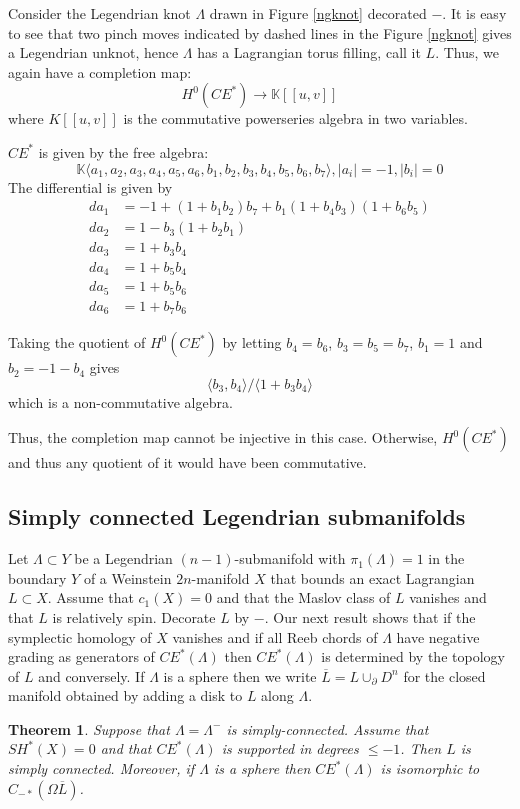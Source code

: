 \documentclass{gtpart}
\newtheorem{thm}{Theorem}
\newcommand{\K}{\mathbb{K}}
\begin{document}
Consider the Legendrian knot $\Lambda$ drawn in Figure \ref{ngknot} decorated $-$. It is easy to see
that two pinch moves indicated by dashed lines in the Figure \ref{ngknot} gives a Legendrian
unknot, hence $\Lambda$ has a Lagrangian torus filling, call it $L$. Thus, we again have a
completion map:
\[ H^0(CE^*) \to \K [[u, v]] \]
where $K[[u,v]]$ is the commutative powerseries algebra in two variables.

$CE^*$ is given by the free algebra:
\[ \K \langle a_1, a_2, a_3, a_4, a_5, a_6, b_1 ,b_2, b_3, b_4, b_5,b_6, b_7 \rangle ,
|a_i|=-1, |b_i| =0 \]
The differential is given by 
\begin{align*}
    da_1 &= -1 + (1+b_1 b_2)b_7 + b_1(1+b_4b_3) (1+b_6 b_5) \\
    da_2 &= 1- b_3(1+ b_2b_1) \\
    da_3 &= 1+ b_3b_4 \\
    da_4 &= 1+ b_5 b_4 \\
    da_5 &= 1+ b_5 b_6 \\
    da_6 &= 1+ b_7 b_6 
\end{align*}

Taking the quotient of $H^0(CE^*)$ by letting $b_4=b_6$, $b_3=b_5=b_7$, $b_1=1$ and $b_2=-1-b_4$
gives
\[ \langle  b_3, b_4 \rangle / \langle 1+ b_3b_4 \rangle \]
which is a non-commutative algebra.

Thus, the completion map cannot be injective in this case. Otherwise, $H^0(CE^*)$ and thus any
quotient of it would have been commutative. 


\subsection{Simply connected Legendrian submanifolds} 
Let $\Lambda\subset Y$ be a Legendrian
$(n-1)$-submanifold with $\pi_1(\Lambda)=1$ in the boundary $Y$ of a Weinstein $2n$-manifold $X$
that bounds an exact Lagrangian $L\subset X$. Assume that $c_{1}(X)=0$ and that the Maslov class of $L$ vanishes and that $L$ is relatively spin. Decorate $L$ by $-$. Our next result shows that if the symplectic homology of $X$ vanishes and if all Reeb
chords of $\Lambda$ have negative grading as generators of $CE^{\ast}(\Lambda)$ then $CE^{\ast}(\Lambda)$ is determined by the topology of $L$ and conversely. If $\Lambda$ is a sphere then we write $\overline{L}=L\cup_{\partial} D^{n}$ for
the closed manifold obtained by adding a disk to $L$ along $\Lambda$. 

\begin{thm} Suppose that $\Lambda =\Lambda^{-}$ is simply-connected. Assume that $SH^*(X)=0$ and that $CE^{\ast}(\Lambda)$ is supported in degrees $\le -1$. Then $L$ is simply connected. Moreover, if $\Lambda$ is a sphere then $CE^*(\Lambda)$ is isomorphic to $C_{-*}(\Omega \overline{L})$.
\end{thm}  
\end{document}
